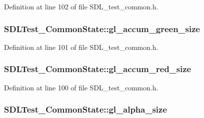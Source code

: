 Definition at line 102 of file S\-D\-L\-\_\-test\-\_\-common.\-h.

\hypertarget{struct_s_d_l_test___common_state_a4c20729a710f51ed67bdd1910da1a16b}{
\subsubsection[{gl\-\_\-accum\-\_\-green\-\_\-size}]{ S\-D\-L\-Test\-\_\-\-Common\-State\-::gl\-\_\-accum\-\_\-green\-\_\-size}}\label{struct_s_d_l_test___common_state_a4c20729a710f51ed67bdd1910da1a16b}


Definition at line 101 of file S\-D\-L\-\_\-test\-\_\-common.\-h.

\hypertarget{struct_s_d_l_test___common_state_ae9d55cebbc3f4e486f4f77a35de4e4dd}{
\subsubsection[{gl\-\_\-accum\-\_\-red\-\_\-size}]{ S\-D\-L\-Test\-\_\-\-Common\-State\-::gl\-\_\-accum\-\_\-red\-\_\-size}}\label{struct_s_d_l_test___common_state_ae9d55cebbc3f4e486f4f77a35de4e4dd}


Definition at line 100 of file S\-D\-L\-\_\-test\-\_\-common.\-h.

\hypertarget{struct_s_d_l_test___common_state_a2b6e86fd695d84f12db148dcf3b2fcb5}{
\subsubsection[{gl\-\_\-alpha\-\_\-size}]{ S\-D\-L\-Test\-\_\-\-Common\-State\-::gl\-\_\-alpha\-\_\-size}}\label{struct_s_d_l_test___common_state_a2b6e86fd695d84f12db148dcf3b2fcb5}



